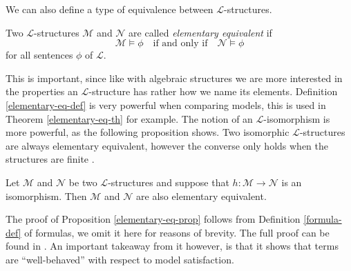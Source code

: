 \documentclass[../../main.tex]{subfiles}
\begin{document}
% 
% 

We can also define a type of equivalence between $\mathcal{L}$-structures.

\begin{definition}\label{elementary-eq-def}\cite[Definition 1.1.9]{Mar02}
    Two $\mathcal{L}$-structures $\mathcal{M}$ and $\mathcal{N}$ are called \emph{elementary equivalent} if
    $$\mathcal{M} \models \phi \quad \text{if and only if} \quad \mathcal{N} \models \phi$$
    for all sentences $\phi$ of $\mathcal{L}$.
\end{definition}

This is important, since like with algebraic structures we are more interested in the properties an $\mathcal{L}$-structure has rather how we name its elements.
Definition \ref{elementary-eq-def} is very powerful when comparing models, this is used in Theorem \ref{elementary-eq-th} for example.
The notion of an $\mathcal{L}$-isomorphism is more powerful, as the following proposition shows.
Two isomorphic $\mathcal{L}$-structures are always elementary equivalent, however the converse only holds when the structures are finite \cite[Proposition 1.3.19]{Cha90}.

\begin{proposition}\label{elementary-eq-prop}\cite[Theorem 1.1.10]{Mar02}
    Let $\mathcal{M}$ and $\mathcal{N}$ be two $\mathcal{L}$-structures and suppose that $h: \mathcal{M} \to \mathcal{N}$ is an isomorphism.
    Then $\mathcal{M}$ and $\mathcal{N}$ are also elementary equivalent.
\end{proposition}
The proof of Proposition \ref{elementary-eq-prop} follows from Definition \ref{formula-def} of formulas, we omit it here for reasons of brevity.
The full proof can be found in \cite{Mar02}.
An important takeaway from it however, is that it shows that terms are ``well-behaved'' with respect to model satisfaction.
\end{document}
